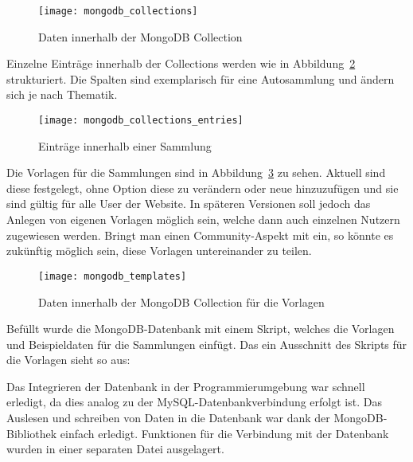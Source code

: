 \begin{figure}[h!]
    \centering
    \texttt{[image: mongodb\_collections]}
    \caption{Daten innerhalb der MongoDB Collection}
    \label{fig:mongodb_collections}
\end{figure}

Einzelne Einträge innerhalb der Collections werden wie in Abbildung~\ref{fig:mongodb_collections_entries} strukturiert.
Die Spalten sind exemplarisch für eine Autosammlung und ändern sich je nach Thematik.

\begin{figure}[h!]
    \centering
    \texttt{[image: mongodb\_collections\_entries]}
    \caption{Einträge innerhalb einer Sammlung}\label{fig:mongodb_collections_entries}
\end{figure}
\newpage

Die Vorlagen für die Sammlungen sind in Abbildung~\ref{fig:mongodb_templates} zu sehen.
Aktuell sind diese festgelegt, ohne Option diese zu verändern oder neue hinzuzufügen und sie sind gültig für alle User der Website.
In späteren Versionen soll jedoch das Anlegen von eigenen Vorlagen möglich sein, welche dann auch einzelnen Nutzern zugewiesen werden.
Bringt man einen Community-Aspekt mit ein, so könnte es zukünftig möglich sein, diese Vorlagen untereinander zu teilen.

\begin{figure}[h]
    \centering
    \texttt{[image: mongodb\_templates]}
    \caption{Daten innerhalb der MongoDB Collection für die Vorlagen}
    \label{fig:mongodb_templates}
\end{figure}

Befüllt wurde die MongoDB-Datenbank mit einem Skript, welches die Vorlagen und Beispieldaten für die Sammlungen einfügt.
Das ein Ausschnitt des Skripts für die Vorlagen sieht so aus:

\vspace{1em}

\vspace{1em}

Das Integrieren der Datenbank in der Programmierumgebung war schnell erledigt, da dies analog zu der MySQL-Datenbankverbindung erfolgt ist.
Das Auslesen und schreiben von Daten in die Datenbank war dank der MongoDB-Bibliothek einfach erledigt.
Funktionen für die Verbindung mit der Datenbank wurden in einer separaten Datei ausgelagert.

